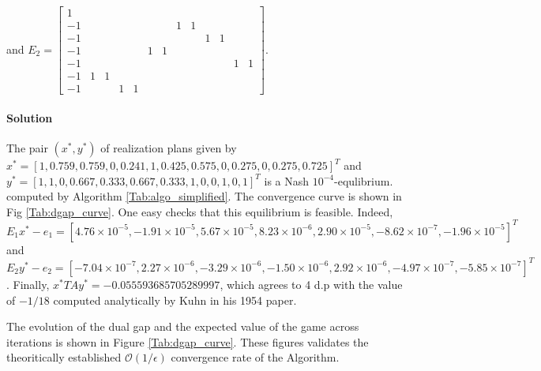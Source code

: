 \documentclass{article} %
\begin{document}
and $E_2 = \left[\begin{array}{ccccccccccccc}
1 &   &   &   &   &   &   &   &   &   &   &   &  \\
-1 &   &   &   &   &   &   & 1 & 1 &   &   &   &  \\
-1 &   &   &   &   &   &   &   &   & 1 & 1 &   &  \\
-1 &   &   &   &   & 1 & 1 &   &   &   &   &   &  \\
-1 &   &   &   &   &   &   &   &   &   &   & 1 & 1\\
-1 & 1 & 1 &   &   &   &   &   &   &   &   &   &  \\
-1 &   &   & 1 & 1 &   &   &   &   &   &   &   &  
\end{array}\right]$.\\

\paragraph{Solution}
The pair $(x^*, y^*)$ of realization plans given by\\
$x^* = [1, 0.759, 0.759, 0, 0.241, 1, 0.425, 0.575, 0, 0.275, 0, 0.275, 0.725]^T$ and
$y^* = [1, 1, 0, 0.667, 0.333, 0.667, 0.333, 1, 0, 0, 1, 0, 1]^T$ is a Nash $10^{-4}$-equlibrium.
computed by Algorithm  \ref{Tab:algo_simplified}. The convergence curve is shown in Fig \ref{Tab:dgap_curve}. One easy checks that this equilibrium is feasible. Indeed,  $E_1x^* - e_1 = [4.76 \times 10^{-5}, -1.91 \times 10^{-5}, 5.67 \times 10^{-5}, 8.23 \times 10^{-6}, 2.90 \times 10^{-5}, -8.62 \times 10^{-7}, -1.96 \times 10^{-5}]^T$ and $E_2y^* - e_2 = [-7.04 \times 10^{-7}, 2.27 \times 10^{-6}, -3.29 \times 10^{-6}, -1.50 \times 10^{-6}, 2.92 \times 10^{-6}, -4.97 \times 10^{-7}, -5.85 \times 10^{-7}]^T$. Finally, $x^*TAy^* = -0.055593685705289997$, which agrees to 4 d.p with the value of $-1 / 18$ computed analytically by Kuhn in his 1954 paper.

The evolution of the dual gap and the expected value of the game across iterations is shown in Figure \ref{Tab:dgap_curve}. These figures validates the theoritically established $\mathcal{O}(1/\epsilon)$ convergence rate of the Algorithm.
\end{document}
